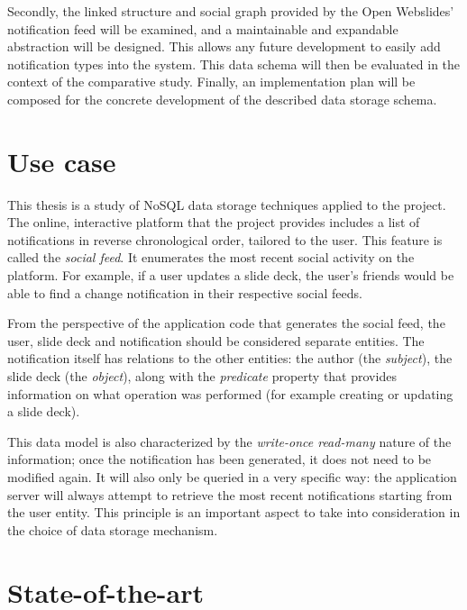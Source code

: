 \documentclass[fleqn,10pt]{voorstel}
\begin{document}
Secondly, the linked structure and social graph provided by the Open Webslides' notification feed will be examined, and a maintainable and expandable abstraction will be designed. This allows any future development to easily add notification types into the system.
This data schema will then be evaluated in the context of the comparative study. Finally, an implementation plan will be composed for the concrete development of the described data storage schema.


\section{Use case}
\label{sec:use-case}

This thesis is a study of NoSQL data storage techniques applied to the \textcite{OpenWebslides} project. The online, interactive platform that the project provides includes a list of notifications in reverse chronological order, tailored to the user. This feature is called the \textit{social feed}. It enumerates the most recent social activity on the platform. For example, if a user updates a slide deck, the user's friends would be able to find a change notification in their respective social feeds.

From the perspective of the application code that generates the social feed, the user, slide deck and notification should be considered separate entities. The notification itself has relations to the other entities: the author (the \textit{subject}), the slide deck (the \textit{object}), along with the \textit{predicate} property that provides information on what operation was performed (for example creating or updating a slide deck).

This data model is also characterized by the \textit{write-once read-many} nature of the information; once the notification has been generated, it does not need to be modified again. It will also only be queried in a very specific way: the application server will always attempt to retrieve the most recent notifications starting from the user entity.
This principle is an important aspect to take into consideration in the choice of data storage mechanism.


\section{State-of-the-art}
\label{sec:state-of-the-art}
\end{document}

